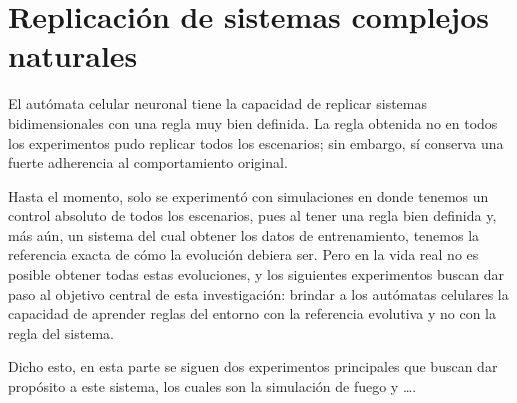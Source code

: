 \clearpage

\section{Replicación de sistemas complejos naturales}

El autómata celular neuronal tiene la capacidad de replicar sistemas bidimensionales con una regla muy bien definida. La regla obtenida no en todos los experimentos pudo replicar todos los escenarios; sin embargo, sí conserva una fuerte adherencia al comportamiento original. 

Hasta el momento, solo se experimentó con simulaciones en donde tenemos un control absoluto de todos los escenarios, pues al tener una regla bien definida y, más aún, un sistema del cual obtener los datos de entrenamiento, tenemos la referencia exacta de cómo la evolución debiera ser. Pero en la vida real no es posible obtener todas estas evoluciones, y los siguientes experimentos buscan dar paso al objetivo central de esta investigación: brindar a los autómatas celulares la capacidad de aprender reglas del entorno con la referencia evolutiva y no con la regla del sistema. 

Dicho esto, en esta parte se siguen dos experimentos principales que buscan dar propósito a este sistema, los cuales son la simulación de fuego y \dots.

